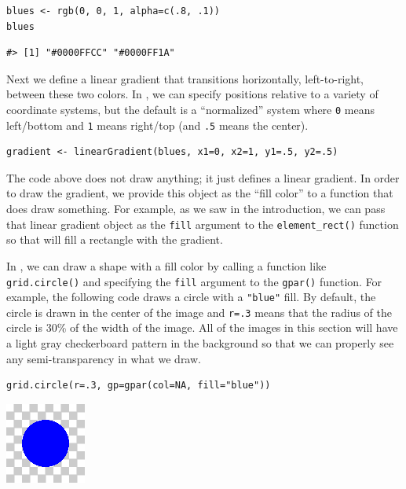 \begin{verbatim}
blues <- rgb(0, 0, 1, alpha=c(.8, .1))
blues
\end{verbatim}

\begin{verbatim}
#> [1] "#0000FFCC" "#0000FF1A"
\end{verbatim}

Next we define a linear gradient that
transitions horizontally, left-to-right, between these two colors.
In , we can specify positions relative to a variety of
coordinate systems, but the default is a ``normalized'' system
where \texttt{0} means left/bottom and \texttt{1} means right/top (and \texttt{.5}
means the center).

\begin{verbatim}
gradient <- linearGradient(blues, x1=0, x2=1, y1=.5, y2=.5)
\end{verbatim}

The code above does not draw anything; it just defines a linear gradient.
In order to draw the gradient, we provide this object as the ``fill color''
to a function that does draw something.
For example,
as we saw in the introduction, we can pass that linear
gradient object as the \texttt{fill} argument to the \texttt{element\_rect()} function so that
 will fill a rectangle with the gradient.

In , we can draw a shape with a fill color by calling
a function like \texttt{grid.circle()} and specifying
the \texttt{fill} argument to the \texttt{gpar()} function.
For example, the following code draws a circle with a \texttt{"blue"} fill.
By default, the circle is drawn in the center of the image and
\texttt{r=.3} means that the radius of the circle is 30\% of the width
of the image.
All of the images in this section will
have a light gray checkerboard pattern in the background
so that we can properly see any semi-transparency
in what we draw.

\begin{verbatim}
grid.circle(r=.3, gp=gpar(col=NA, fill="blue"))
\end{verbatim}

\includegraphics{murrell-definitions-2023_files/figure-latex/unnamed-chunk-3-1.png}

